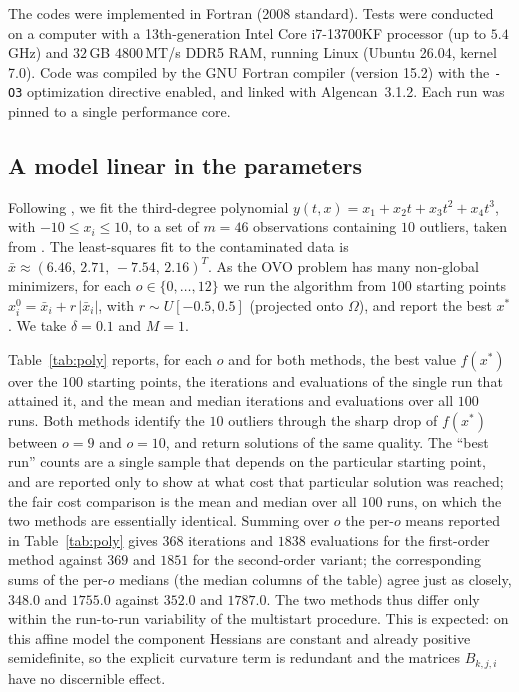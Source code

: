 \documentclass[11pt]{article}
\newcounter{alg}[section]
\begin{document}
The codes were implemented in Fortran (2008 standard). Tests were conducted on a computer
with a 13th-generation Intel Core i7-13700KF processor (up to $5.4$\,GHz) and
$32$\,GB $4800$\,MT/s DDR5 RAM,
running Linux (Ubuntu 26.04, kernel 7.0). Code was compiled by the GNU Fortran
compiler (version 15.2) with the \texttt{-O3} optimization directive enabled,
and linked with Algencan~3.1.2.
Each run was pinned to a single performance core.

\subsection{A model linear in the parameters} \label{subsec:poly}

Following \cite{dunder1}, we fit the third-degree polynomial
$y(t,x)=x_1+x_2t+x_3t^2+x_4t^3$, with $-10\le x_i\le10$, to a set of $m=46$
observations containing $10$ outliers, taken from \cite{dunder1}. The
least-squares fit to the contaminated data is
$\bar x\approx(6.46,\,2.71,\,-7.54,\,2.16)^T$. As the OVO problem has many
non-global minimizers, for each $o\in\{0,\dots,12\}$ we run the algorithm from
$100$ starting points $x^0_i=\bar x_i+r\,|\bar x_i|$, with $r\sim U[-0.5,0.5]$
(projected onto $\Omega$), and report the best $x^*$. We take $\delta=0.1$ and
$M=1$.

Table~\ref{tab:poly} reports, for each $o$ and for both methods, the best value
$f(x^*)$ over the $100$ starting points, the iterations and evaluations of the
single run that attained it, and the mean and median iterations and evaluations
over all $100$ runs. Both methods identify the $10$ outliers
through the sharp drop of $f(x^*)$ between $o=9$ and $o=10$, and return solutions
of the same quality. The ``best run'' counts are a single sample that depends on
the particular starting point, and are reported only to show at what cost that
particular solution was reached; the fair cost comparison is the mean and median over all
$100$ runs, on which the two methods are essentially identical. Summing over $o$
the per-$o$ means reported in
Table~\ref{tab:poly} gives $368$ iterations and $1838$ evaluations for the
first-order method against $369$ and $1851$ for the second-order variant; the
corresponding sums of the per-$o$ medians (the median columns of the table)
agree just as closely, $348.0$ and $1755.0$ against $352.0$ and $1787.0$. The two methods thus
differ only within the run-to-run variability of the multistart
procedure. This is expected: on this affine model the component Hessians are
constant and already positive semidefinite, so the explicit curvature term is
redundant and the matrices $B_{k,j,i}$ have no discernible effect.
\end{document}
